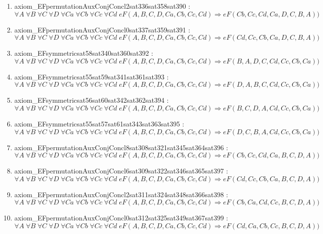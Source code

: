 \documentclass{article}
\begin{document}
\begin{enumerate}
\item axiom\_EFpermutationAuxConjConcl2sat336sat358sat390 : $\forall A\;\forall B\;\forall C\;\forall D\;\forall Ca\;\forall Cb\;\forall Cc\;\forall Cd\;eF(A, B, C, D, Ca, Cb, Cc, Cd) \Rightarrow eF(Cb, Cc, Cd, Ca, D, C, B, A))$
\item axiom\_EFpermutationAuxConjConcl0sat337sat359sat391 : $\forall A\;\forall B\;\forall C\;\forall D\;\forall Ca\;\forall Cb\;\forall Cc\;\forall Cd\;eF(A, B, C, D, Ca, Cb, Cc, Cd) \Rightarrow eF(Cd, Cc, Cb, Ca, D, C, B, A))$
\item axiom\_EFsymmetricsat58sat340sat360sat392 : $\forall A\;\forall B\;\forall C\;\forall D\;\forall Ca\;\forall Cb\;\forall Cc\;\forall Cd\;eF(A, B, C, D, Ca, Cb, Cc, Cd) \Rightarrow eF(B, A, D, C, Cd, Cc, Cb, Ca))$
\item axiom\_EFsymmetricsat55sat59sat341sat361sat393 : $\forall A\;\forall B\;\forall C\;\forall D\;\forall Ca\;\forall Cb\;\forall Cc\;\forall Cd\;eF(A, B, C, D, Ca, Cb, Cc, Cd) \Rightarrow eF(D, A, B, C, Cd, Cc, Cb, Ca))$
\item axiom\_EFsymmetricsat56sat60sat342sat362sat394 : $\forall A\;\forall B\;\forall C\;\forall D\;\forall Ca\;\forall Cb\;\forall Cc\;\forall Cd\;eF(A, B, C, D, Ca, Cb, Cc, Cd) \Rightarrow eF(B, C, D, A, Cd, Cc, Cb, Ca))$
\item axiom\_EFsymmetricsat55sat57sat61sat343sat363sat395 : $\forall A\;\forall B\;\forall C\;\forall D\;\forall Ca\;\forall Cb\;\forall Cc\;\forall Cd\;eF(A, B, C, D, Ca, Cb, Cc, Cd) \Rightarrow eF(D, C, B, A, Cd, Cc, Cb, Ca))$
\item axiom\_EFpermutationAuxConjConcl8sat308sat321sat345sat364sat396 : $\forall A\;\forall B\;\forall C\;\forall D\;\forall Ca\;\forall Cb\;\forall Cc\;\forall Cd\;eF(A, B, C, D, Ca, Cb, Cc, Cd) \Rightarrow eF(Cb, Cc, Cd, Ca, B, C, D, A))$
\item axiom\_EFpermutationAuxConjConcl6sat309sat322sat346sat365sat397 : $\forall A\;\forall B\;\forall C\;\forall D\;\forall Ca\;\forall Cb\;\forall Cc\;\forall Cd\;eF(A, B, C, D, Ca, Cb, Cc, Cd) \Rightarrow eF(Cd, Cc, Cb, Ca, B, C, D, A))$
\item axiom\_EFpermutationAuxConjConcl2sat311sat324sat348sat366sat398 : $\forall A\;\forall B\;\forall C\;\forall D\;\forall Ca\;\forall Cb\;\forall Cc\;\forall Cd\;eF(A, B, C, D, Ca, Cb, Cc, Cd) \Rightarrow eF(Cb, Ca, Cd, Cc, B, C, D, A))$
\item axiom\_EFpermutationAuxConjConcl0sat312sat325sat349sat367sat399 : $\forall A\;\forall B\;\forall C\;\forall D\;\forall Ca\;\forall Cb\;\forall Cc\;\forall Cd\;eF(A, B, C, D, Ca, Cb, Cc, Cd) \Rightarrow eF(Cd, Ca, Cb, Cc, B, C, D, A))$

\end{enumerate}
\end{document}
